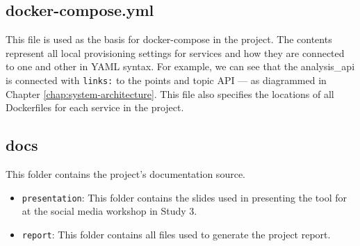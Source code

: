 \subsection*{docker-compose.yml}
  This file is used as the basis for docker-compose in the project. The contents represent all local provisioning settings for services and how they are connected to one and other in YAML syntax. For example, we can see that the analysis\_api is connected with \texttt{links:} to the points and topic API --- as diagrammed in Chapter \ref{chap:system-architecture}. This file also specifies the locations of all Dockerfiles for each service in the project.

\subsection*{docs}
  This folder contains the project's documentation source.
  \begin{itemize}
    \item
      \texttt{presentation}: This folder contains the slides used in presenting the tool for at the social media workshop in Study 3.
    \item
      \texttt{report}: This folder contains all files used to generate the project report.
  \end{itemize}

